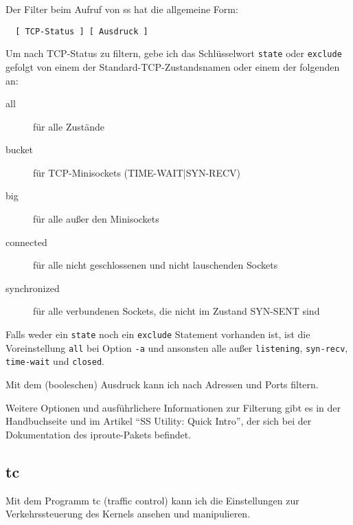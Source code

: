   Der Filter beim Aufruf von ss hat die allgemeine Form:
  \begin{verbatim}
  [ TCP-Status ] [ Ausdruck ]
  \end{verbatim}

  Um nach TCP-Status zu filtern, gebe ich das Schlüsselwort \verb?state? oder
  \verb?exclude? gefolgt von einem der Standard-TCP-Zustandsnamen oder einem
  der folgenden an:
  \begin{description}
    \item[all] für alle Zustände
    \item[bucket] für TCP-Minisockets (TIME-WAIT|SYN-RECV)
    \item[big] für alle außer den Minisockets
    \item[connected] für alle nicht geschlossenen und nicht lauschenden
      Sockets
    \item[synchronized] für alle verbundenen Sockets, die nicht im Zustand
      SYN-SENT sind
  \end{description}

  Falls weder ein \verb?state? noch ein \verb?exclude? Statement vorhanden
  ist, ist die Voreinstellung \verb?all? bei Option \verb?-a? und ansonsten
  alle außer \verb?listening?, \verb?syn-recv?, \verb?time-wait? und
  \verb?closed?.

  Mit dem (booleschen) Ausdruck kann ich nach Adressen und Ports filtern.

  Weitere Optionen und ausführlichere Informationen zur Filterung gibt es in
  der Handbuchseite und im Artikel ``SS Utility: Quick Intro'', der sich bei
  der Dokumentation des iproute-Pakets befindet.

  \subsection*{tc}

  Mit dem Programm tc (traffic control) kann ich die Einstellungen zur
  Verkehrssteuerung des Kernels ansehen und manipulieren.

